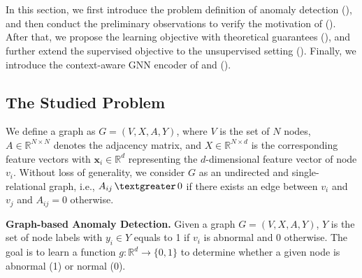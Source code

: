 \section{\model}
\label{sec:approach}
In this section, we first introduce the problem definition of anomaly detection (), and then conduct the preliminary observations to verify the motivation of \smodel(). After that, we propose the  learning objective with theoretical guarantees (), and further extend the supervised objective to the unsupervised setting (). 
Finally, we introduce the context-aware GNN encoder of \smodel and \spmodel().




\subsection{The Studied Problem}
\label{sec:problem}
We define a graph as $G = \left(V, X, A, Y\right)$, where 
$V$ is the set of $N$ nodes, 
$A \in \mathbb{R}^{N \times N}$ denotes the adjacency matrix,
and ${X} \in \mathbb{R}^{N \times d}$ is the corresponding feature vectors with $\boldsymbol{x}_i \in \mathbb{R}^d$ representing the $d$-dimensional feature vector of node $v_i$.
Without loss of generality, 
we consider $G$ as an undirected and single-relational graph, i.e., $A_{ij}\, \textgreater\, 0$ if there exists an edge between $v_i$ and $v_j$ and $A_{ij} = 0$ otherwise.

\begin{problem} \textbf{Graph-based Anomaly Detection.} Given a graph $G = \left(V, X, A, Y\right)$, $Y$ is the set of node labels with $y_i \in Y$ equals to 1 if $v_i$ is abnormal and 0 otherwise. 
	The goal is to learn a function $g: \mathbb{R}^d \rightarrow \{0,1\}$ to determine whether a given node is abnormal (1) or normal (0). 
\end{problem}

